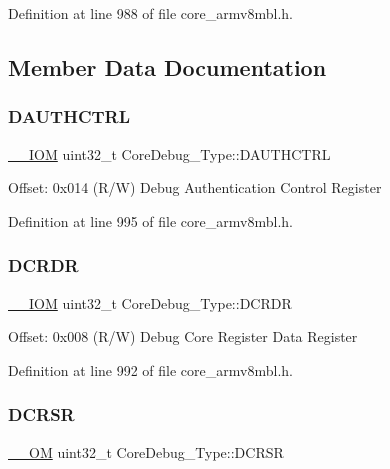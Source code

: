 Definition at line 988 of file core\+\_\+armv8mbl.\+h.



\subsection{Member Data Documentation}
\mbox{\label{struct_core_debug___type_a1b319a8279b9ff2572ab5391dba5bb88}} 
\subsubsection{\texorpdfstring{D\+A\+U\+T\+H\+C\+T\+RL}{DAUTHCTRL}}
{\footnotesize\ttfamily \hyperlink{core__sc300_8h_ab6caba5853a60a17e8e04499b52bf691}{\+\_\+\+\_\+\+I\+OM} uint32\+\_\+t Core\+Debug\+\_\+\+Type\+::\+D\+A\+U\+T\+H\+C\+T\+RL}

Offset\+: 0x014 (R/W) Debug Authentication Control Register 

Definition at line 995 of file core\+\_\+armv8mbl.\+h.

\mbox{\label{struct_core_debug___type_aab3cc92ef07bc1f04b3a3aa6db2c2d55}} 
\subsubsection{\texorpdfstring{D\+C\+R\+DR}{DCRDR}}
{\footnotesize\ttfamily \hyperlink{core__sc300_8h_ab6caba5853a60a17e8e04499b52bf691}{\+\_\+\+\_\+\+I\+OM} uint32\+\_\+t Core\+Debug\+\_\+\+Type\+::\+D\+C\+R\+DR}

Offset\+: 0x008 (R/W) Debug Core Register Data Register 

Definition at line 992 of file core\+\_\+armv8mbl.\+h.

\mbox{\label{struct_core_debug___type_af907cf64577eaf927dac6787df6dd98b}} 
\subsubsection{\texorpdfstring{D\+C\+R\+SR}{DCRSR}}
{\footnotesize\ttfamily \hyperlink{core__sc300_8h_a0ea2009ed8fd9ef35b48708280fdb758}{\+\_\+\+\_\+\+OM} uint32\+\_\+t Core\+Debug\+\_\+\+Type\+::\+D\+C\+R\+SR}

